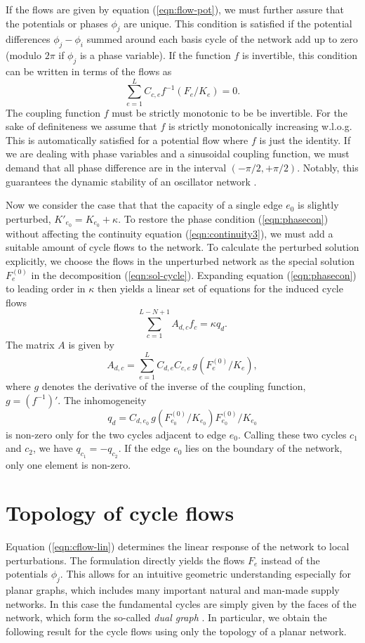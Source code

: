 \documentclass[10pt,aps,pra,twocolumn,superscriptaddress]{revtex4-1}
\newcommand{\be}{\begin{equation}}
\newcommand{\ee}{\end{equation}}
\begin{document}
If the flows are given by equation  (\ref{eqn:flow-pot}), we must further assure that the potentials or phases $\phi_j$ are unique. This condition is satisfied if the potential differences $\phi_j - \phi_i$ summed around each basis cycle of the network add up to zero (modulo $2\pi$ if $\phi_j$ is a phase variable). If the function $f$ is invertible, this condition can be written in terms of the flows as 
\be
   \sum_{e=1}^L C_{c,e} f^{-1}(F_e/K_e) = 0.
   \label{eqn:phasecon}
\ee
The coupling function $f$ must be strictly monotonic to be be invertible. For
the sake of definiteness we assume that $f$ is strictly monotonically increasing w.l.o.g.
This is automatically satisfied for a potential flow where $f$ is just the identity. 
If we are dealing with phase variables and a sinusoidal coupling function, we must 
demand that all phase difference are in the interval $(-\pi/2,+\pi/2)$. Notably, this 
guarantees the dynamic stability of an oscillator network  \cite{14bifurcation}.

Now we consider the case that that the capacity of a single edge $e_0$ is slightly perturbed, 
$K'_{e_0} = K_{e_0} + \kappa$. To restore the phase condition (\ref{eqn:phasecon}) without affecting the continuity equation (\ref{eqn:continuity3}), we must add a suitable amount of cycle flows to the network. To calculate the perturbed solution explicitly, we choose the flows in the unperturbed network as the special solution $F_e^{(0)}$ in the decomposition (\ref{eqn:sol-cycle}). Expanding equation  (\ref{eqn:phasecon}) to leading order in $\kappa$ then yields a linear set of equations for the induced cycle flows
\be
    \sum_{c=1}^{L-N+1} A_{d,c} f_c = \kappa q_d.  
    \label{eqn:cflow-lin}
\ee
The matrix $A$ is given by 
\be
   A_{d,c} = \sum_{e=1}^L C_{d,e} C_{c,e} \, g(F^{(0)}_e/K_e),
   \label{eqn:def-A}
\ee  
where $g$ denotes the derivative of the inverse of the coupling function, $g = (f^{-1})'$. 
The inhomogeneity
\be
   q_d = C_{d,e_0} \, g(F^{(0)}_{e_0}/K_{e_0}) F^{(0)}_{e_0}/K_{e_0}
   \label{eqn:cflow-inhom}
\ee
is non-zero only for the two cycles adjacent to edge $e_0$. Calling these two cycles $c_1$ and $c_2$, we have $q_{c_1} = - q_{c_2}$. If the edge $e_0$ lies on the boundary of the network, only one element is non-zero.


\section{Topology of cycle flows}
\label{sec:domains}

Equation (\ref{eqn:cflow-lin}) determines the linear response of the network to local perturbations. The formulation directly yields the flows $F_e$ instead of the potentials $\phi_j$. This allows for an intuitive geometric understanding especially for planar graphs, which includes many important natural and man-made supply networks. In this case the fundamental cycles are simply given by the faces of the network, which form
the so-called \emph{dual graph} \cite{Dies10}. In particular, we obtain the following result for the cycle flows using only the topology of a planar network.
\end{document}
